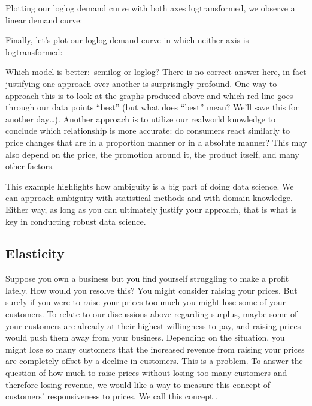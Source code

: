 \documentclass[letterpaper,10pt,english]{jupyterBook}
\begin{document}
\sphinxAtStartPar
Plotting our log\sphinxhyphen{}log demand curve with both axes log\sphinxhyphen{}transformed, we observe a linear demand curve:

\noindent{}

\sphinxAtStartPar
Finally, let’s plot our log\sphinxhyphen{}log demand curve in which neither axis is log\sphinxhyphen{}transformed:

\noindent{}

\sphinxAtStartPar
Which model is better: semi\sphinxhyphen{}log or log\sphinxhyphen{}log? There is no correct answer here, in fact justifying one approach over another is surprisingly profound. One way to approach this is to look at the graphs produced above and which red line goes through our data points “best” (but what does “best” mean? We’ll save this for another day…). Another approach is to utilize our real\sphinxhyphen{}world knowledge to conclude which relationship is more accurate: do consumers react similarly to price changes that are in a proportion manner or in a absolute manner? This may also depend on the price, the promotion around it, the product itself, and many other factors.

\sphinxAtStartPar
This example highlights how ambiguity is a big part of doing data science. We can approach ambiguity with statistical methods and with domain knowledge. Either way, as long as you can ultimately justify your approach, that is what is key in conducting robust data science.


\subsection{Elasticity}
\label{\detokenize{content/01-demand/04-elasticity:elasticity}}\label{\detokenize{content/01-demand/04-elasticity::doc}}
\sphinxAtStartPar
Suppose you own a business but you find yourself struggling to make a profit lately. How would you resolve this? You might consider raising your prices. But surely if you were to raise your prices too much you might lose some of your customers. To relate to our discussions above regarding surplus, maybe some of your customers are already at their highest willingness to pay, and raising prices would push them away from your business. Depending on the situation, you might lose so many customers that the increased revenue from raising your prices are completely offset by a decline in customers. This is a problem. To answer the question of how much to raise prices without losing too many customers and therefore losing revenue, we would like a way to measure this concept of customers’ responsiveness to prices. We call this concept .
\end{document}
